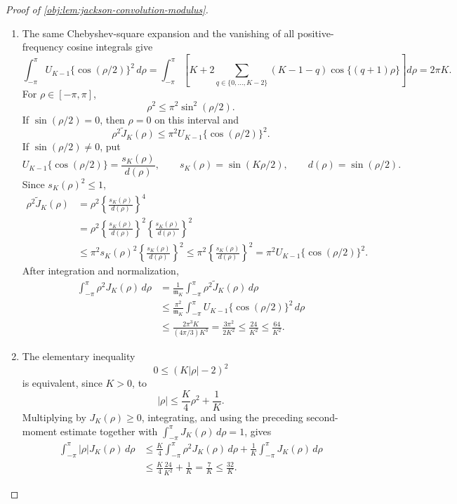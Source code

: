 \documentclass[11pt]{article}
\begin{document}
\begin{proof}[Proof of \cref{obj:lem:jackson-convolution-modulus}]
\begin{enumerate}
\item The same Chebyshev-square expansion and the vanishing of all positive-frequency cosine integrals give
\[
\int_{-\pi}^{\pi}
U_{K-1}\{\cos(\rho/2)\}^2\,d\rho
=
\int_{-\pi}^{\pi}
\left[
K+2\sum_{q\in\{0,\ldots,K-2\}}(K-1-q)\cos\{(q+1)\rho\}
\right]d\rho
=
2\pi K .
\]
For \(\rho\in[-\pi,\pi]\),
\[
\rho^2\le \pi^2\sin^2(\rho/2).
\]
If \(\sin(\rho/2)=0\), then \(\rho=0\) on this interval and
\[
\rho^2\widetilde J_K(\rho)
\le
\pi^2U_{K-1}\{\cos(\rho/2)\}^2 .
\]
If \(\sin(\rho/2)\ne0\), put
\[
U_{K-1}\{\cos(\rho/2)\}=\frac{s_K(\rho)}{d(\rho)},
\qquad
s_K(\rho)=\sin(K\rho/2),
\qquad
d(\rho)=\sin(\rho/2).
\]
Since \(s_K(\rho)^2\le1\),
\[
\begin{aligned}
\rho^2\widetilde J_K(\rho)
&=
\rho^2\left\{\frac{s_K(\rho)}{d(\rho)}\right\}^4  \\
&=
\rho^2\left\{\frac{s_K(\rho)}{d(\rho)}\right\}^2
\left\{\frac{s_K(\rho)}{d(\rho)}\right\}^2  \\
&\le
\pi^2s_K(\rho)^2
\left\{\frac{s_K(\rho)}{d(\rho)}\right\}^2
\le
\pi^2
\left\{\frac{s_K(\rho)}{d(\rho)}\right\}^2
=
\pi^2U_{K-1}\{\cos(\rho/2)\}^2 .
\end{aligned}
\]
After integration and normalization,
\[
\begin{aligned}
\int_{-\pi}^{\pi}\rho^2J_K(\rho)\,d\rho
&=
\frac{1}{\mathfrak m_K}
\int_{-\pi}^{\pi}\rho^2\widetilde J_K(\rho)\,d\rho  \\
&\le
\frac{\pi^2}{\mathfrak m_K}
\int_{-\pi}^{\pi}U_{K-1}\{\cos(\rho/2)\}^2\,d\rho  \\
&\le
\frac{2\pi^3K}{(4\pi/3)K^3}
=
\frac{3\pi^2}{2K^2}
\le
\frac{24}{K^2}
\le
\frac{64}{K^2}.
\end{aligned}
\] %

\item The elementary inequality
\[
0\le (K|\rho|-2)^2
\]
is equivalent, since \(K>0\), to
\[
|\rho|\le \frac K4\rho^2+\frac1K .
\]
Multiplying by \(J_K(\rho)\ge0\), integrating, and using the preceding second-moment estimate together with \(\int_{-\pi}^{\pi}J_K(\rho)\,d\rho=1\), gives
\[
\begin{aligned}
\int_{-\pi}^{\pi}|\rho|J_K(\rho)\,d\rho
&\le
\frac K4\int_{-\pi}^{\pi}\rho^2J_K(\rho)\,d\rho
+
\frac1K\int_{-\pi}^{\pi}J_K(\rho)\,d\rho  \\
&\le
\frac K4\frac{24}{K^2}+\frac1K
=
\frac7K
\le
\frac{32}{K}.
\end{aligned}
\] %


\end{enumerate}
\end{proof}
\end{document}
